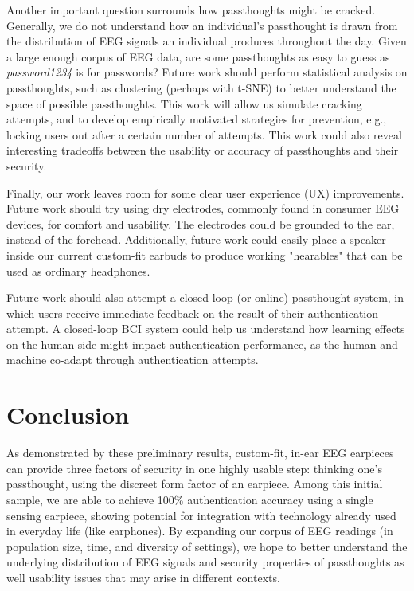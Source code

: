 \documentclass{sigchi}
\begin{document}
Another important question surrounds how passthoughts might be cracked. Generally, we do not understand how an individual's passthought is drawn from the distribution of EEG signals an individual produces throughout the day. Given a large enough corpus of EEG data, are some passthoughts as easy to guess as \textit{password1234} is for passwords? Future work should perform statistical analysis on passthoughts, such as clustering (perhaps with t-SNE) to better understand the space of possible passthoughts. This work will allow us simulate cracking attempts, and to develop empirically motivated strategies for prevention, e.g., locking users out after a certain number of attempts. This work could also reveal interesting tradeoffs between the usability or accuracy of passthoughts and their security.

Finally, our work leaves room for some clear user experience (UX) improvements. Future work should try using dry electrodes, commonly found in consumer EEG devices, for comfort and usability. The electrodes could be grounded to the ear, instead of the forehead. Additionally, future work could easily place a speaker inside our current custom-fit earbuds to produce working "hearables" that can be used as ordinary headphones.

Future work should also attempt a closed-loop (or online) passthought system, in which users receive immediate feedback on the result of their authentication attempt. A closed-loop BCI system could help us understand how learning effects on the human side might impact authentication performance, as the human and machine co-adapt through authentication attempts.

\section{Conclusion}

As demonstrated by these preliminary results, custom-fit, in-ear EEG earpieces can provide three factors of security in one highly usable step: thinking one's passthought, using the discreet form factor of an earpiece. Among this initial sample, we are able to achieve 100\% authentication accuracy using a single sensing earpiece, showing potential for integration with technology already used in everyday life (like earphones). By expanding our corpus of EEG readings (in population size, time, and diversity of settings), we hope to better understand the underlying distribution of EEG signals and security properties of passthoughts as well usability issues that may arise in different contexts.
\end{document}
